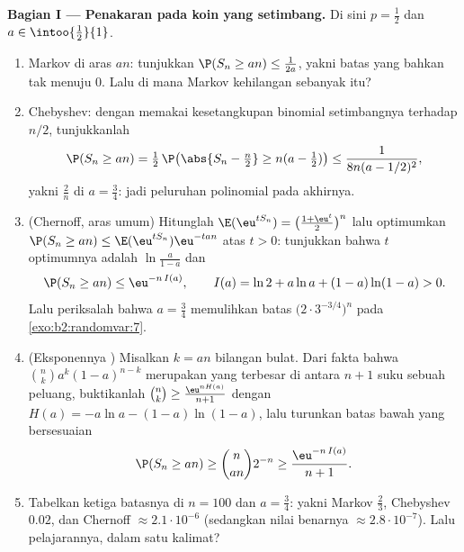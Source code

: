 \begin{problem}
\medskip
\noindent\textbf{Bagian I --- Penakaran pada koin yang setimbang.}
Di sini $p = \frac12$ dan $a \in \intoo{\frac12}{1}$.
\begin{enumerate}
  \item Markov di aras $an$: tunjukkan $\P(S_n \geq an) \leq
        \frac1{2a}$, yakni batas yang bahkan tak menuju $0$.
        Lalu di mana Markov kehilangan sebanyak itu?
  \item Chebyshev: dengan memakai kesetangkupan binomial setimbangnya
        terhadap $n/2$, tunjukkanlah
        \[
        \P(S_n \geq an) = \tfrac12\,
        \P\bigl(\abs{S_n - \tfrac n2} \geq n(a -
        \tfrac12)\bigr)
        \leq \frac{1}{8n(a - 1/2)^2},
        \]
        yakni $\frac2n$ di $a = \frac34$: jadi peluruhan polinomial pada
        akhirnya.
  \item (Chernoff, aras umum) Hitunglah
        $\E(\eu^{tS_n}) = \bigl(\frac{1 + \eu^t}2\bigr)^n$ lalu
        optimumkan $\P(S_n \geq an) \leq
        \E(\eu^{tS_n})\eu^{-tan}$ atas $t > 0$: tunjukkan bahwa
        $t$ optimumnya adalah $\ln\frac{a}{1-a}$ dan
        \[
        \P(S_n \geq an) \leq \eu^{-n\,I(a)},
        \qquad
        I(a) = \ln 2 + a\ln a + (1-a)\ln(1-a) > 0 .
        \]
        Lalu periksalah bahwa $a = \frac34$ memulihkan batas
        $\bigl(2\cdot3^{-3/4}\bigr)^n$ pada
        \cref{exo:b2:randomvar:7}.
  \item (Eksponennya ) Misalkan $k = an$ bilangan bulat.
        Dari fakta bahwa $\binom nk a^k(1-a)^{n-k}$ merupakan
        yang terbesar di antara $n + 1$ suku sebuah 
        peluang, buktikanlah $\binom nk \geq
        \frac{\eu^{nH(a)}}{n+1}$ dengan $H(a) = -a\ln a -
        (1-a)\ln(1-a)$, lalu turunkan batas bawah yang bersesuaian
        \[
        \P(S_n \geq an) \geq \binom{n}{an}2^{-n}
        \geq \frac{\eu^{-n\,I(a)}}{n + 1} .
        \]
  \item Tabelkan ketiga batasnya di $n = 100$ dan $a =
        \frac34$: yakni Markov $\frac23$, Chebyshev $0.02$, dan
        Chernoff $\approx 2.1\cdot10^{-6}$ (sedangkan nilai benarnya
        $\approx 2.8\cdot10^{-7}$). Lalu pelajarannya, dalam satu kalimat?
\end{enumerate}


\end{problem}
